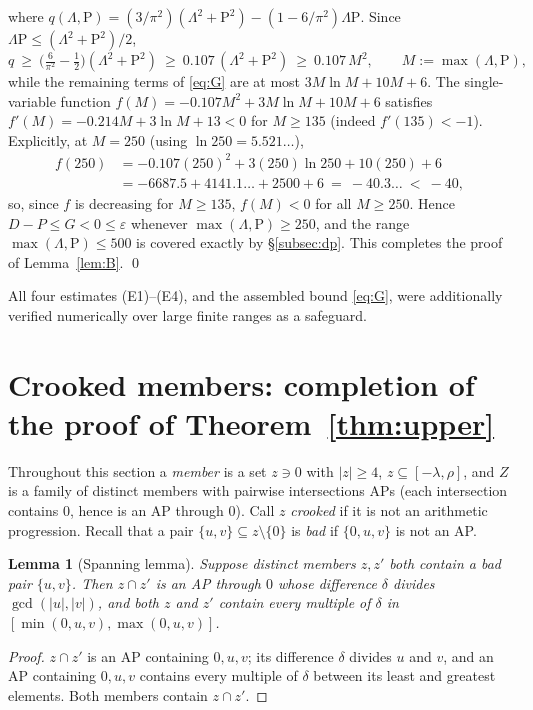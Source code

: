 \documentclass[11pt]{article}
\newtheorem{lemma}[theorem]{Lemma}
\theoremstyle{definition}
\begin{document}
where $q(\Lambda,\mathrm{P})=(3/\pi^2)(\Lambda^2+\mathrm{P}^2)-(1-6/\pi^2)\Lambda \mathrm{P}$. Since $\Lambda \mathrm{P}\le(\Lambda^2+\mathrm{P}^2)/2$,
\[ q\ \ge\ \Big(\tfrac{6}{\pi^2}-\tfrac12\Big)(\Lambda^2+\mathrm{P}^2)\ \ge\ 0.107\,(\Lambda^2+\mathrm{P}^2)\ \ge\ 0.107\,M^2, \qquad M:=\max(\Lambda,\mathrm{P}), \]
while the remaining terms of \eqref{eq:G} are at most $3M\ln M+10M+6$. The single-variable function $f(M)=-0.107M^2+3M\ln M+10M+6$ satisfies $f'(M)=-0.214M+3\ln M+13<0$ for $M\ge 135$ (indeed $f'(135)<-1$). Explicitly, at $M=250$ (using $\ln 250=5.521\ldots$),
\begin{align*}
f(250) &= -0.107(250)^2+3(250)\ln 250+10(250)+6\\
&= -6687.5+4141.1\ldots+2500+6\ =\ -40.3\ldots\ <\ -40,
\end{align*}
so, since $f$ is decreasing for $M\ge135$, $f(M)<0$ for all $M\ge 250$. Hence $D-P\le G<0\le\varepsilon$ whenever $\max(\Lambda,\mathrm{P})\ge 250$, and the range $\max(\Lambda,\mathrm{P})\le 500$ is covered exactly by \S\ref{subsec:dp}. This completes the proof of Lemma~\ref{lem:B}. \qed

\medskip
All four estimates (E1)--(E4), and the assembled bound \eqref{eq:G}, were additionally verified numerically over large finite ranges as a safeguard.

\section{Crooked members: completion of the proof of Theorem~\ref{thm:upper}}\label{sec:crooked}

Throughout this section a \emph{member} is a set $z\ni 0$ with $|z|\ge 4$, $z\subseteq[-\lambda,\rho]$, and $Z$ is a family of distinct members with pairwise intersections APs (each intersection contains $0$, hence is an AP through $0$). Call $z$ \emph{crooked} if it is not an arithmetic progression. Recall that a pair $\{u,v\}\subseteq z\setminus\{0\}$ is \emph{bad} if $\{0,u,v\}$ is not an AP.

\begin{lemma}[Spanning lemma]\label{lem:span}
Suppose distinct members $z,z'$ both contain a bad pair $\{u,v\}$. Then $z\cap z'$ is an AP through $0$ whose difference $\delta$ divides $\gcd(|u|,|v|)$, and both $z$ and $z'$ contain every multiple of $\delta$ in $[\min(0,u,v),\max(0,u,v)]$.
\end{lemma}

\begin{proof}
$z\cap z'$ is an AP containing $0,u,v$; its difference $\delta$ divides $u$ and $v$, and an AP containing $0,u,v$ contains every multiple of $\delta$ between its least and greatest elements. Both members contain $z\cap z'$.
\end{proof}
\end{document}
